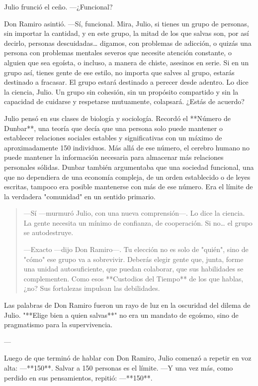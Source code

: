 \documentclass[a4paper,12pt]{book}
\begin{document}
Julio frunció el ceño. —¿Funcional?

Don Ramiro asintió. —Sí, funcional. Mira, Julio, si tienes un grupo de personas, sin importar la cantidad, y en este grupo, la mitad de los que salvas son, por así decirlo, personas descuidadas… digamos, con problemas de adicción, o quizás una persona con problemas mentales severos que necesite atención constante, o alguien que sea egoísta, o incluso, a manera de chiste, asesinos en serie. Si en un grupo así, tienes gente de ese estilo, no importa que salves al grupo, estarás destinado a fracasar. El grupo estará destinado a perecer desde adentro. Lo dice la ciencia, Julio. Un grupo sin cohesión, sin un propósito compartido y sin la capacidad de cuidarse y respetarse mutuamente, colapsará. ¿Estás de acuerdo?

Julio pensó en sus clases de biología y sociología. Recordó el **Número de Dunbar**, una teoría que decía que una persona solo puede mantener o establecer relaciones sociales estables y significativas con un máximo de aproximadamente 150 individuos. Más allá de ese número, el cerebro humano no puede mantener la información necesaria para almacenar más relaciones personales sólidas. Dunbar también argumentaba que una sociedad funcional, una que no dependiera de una economía compleja, de un orden establecido o de leyes escritas, tampoco era posible mantenerse con más de ese número. Era el límite de la verdadera "comunidad" en un sentido primario.

\begin{quote}
    —Sí —murmuró Julio, con una nueva comprensión—. Lo dice la ciencia. La gente necesita un mínimo de confianza, de cooperación. Si no… el grupo se autodestruye.

    —Exacto —dijo Don Ramiro—. Tu elección no es solo de "quién", sino de "cómo" ese grupo va a sobrevivir. Deberás elegir gente que, junta, forme una unidad autosuficiente, que puedan colaborar, que sus habilidades se complementen. Como esos **Custodios del Tiempo** de los que hablas, ¿no? Sus fortalezas impulsan las debilidades.
\end{quote}

Las palabras de Don Ramiro fueron un rayo de luz en la oscuridad del dilema de Julio. "**Elige bien a quien salvas**" no era un mandato de egoísmo, sino de pragmatismo para la supervivencia.

---

Luego de que terminó de hablar con Don Ramiro, Julio comenzó a repetir en voz alta: —**150**. Salvar a 150 personas es el límite. —Y una vez más, como perdido en sus pensamientos, repitió: —**150**.
\end{document}
